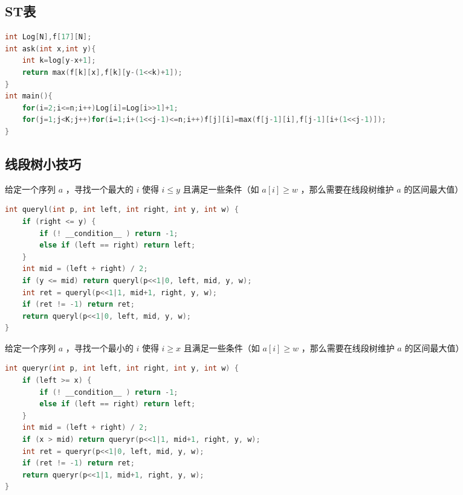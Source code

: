 \documentclass{article}
\begin{document}
\begin{CJK}{UTF8}{song}
\subsection{ST表}
\begin{lstlisting}[language=C++]
int Log[N],f[17][N];
int ask(int x,int y){
	int k=log[y-x+1];
	return max(f[k][x],f[k][y-(1<<k)+1]);
}
int main(){
	for(i=2;i<=n;i++)Log[i]=Log[i>>1]+1;
	for(j=1;j<K;j++)for(i=1;i+(1<<j-1)<=n;i++)f[j][i]=max(f[j-1][i],f[j-1][i+(1<<j-1)]);
}
\end{lstlisting}
\subsection{线段树小技巧}
给定一个序列 $a$ ，寻找一个最大的 $i$ 使得 $i \leq y$ 且满足一些条件（如 $a[i] \geq w$ ，那么需要在线段树维护 $a$ 的区间最大值）
\begin{lstlisting}[language=C++]
int queryl(int p, int left, int right, int y, int w) {
	if (right <= y) {
		if (! __condition__ ) return -1;
		else if (left == right) return left;
	}
	int mid = (left + right) / 2;
	if (y <= mid) return queryl(p<<1|0, left, mid, y, w);
	int ret = queryl(p<<1|1, mid+1, right, y, w);
	if (ret != -1) return ret;
	return queryl(p<<1|0, left, mid, y, w);
}
\end{lstlisting}
给定一个序列 $a$ ，寻找一个最小的 $i$ 使得 $i \geq x$ 且满足一些条件（如 $a[i] \geq w$ ，那么需要在线段树维护 $a$ 的区间最大值）
\begin{lstlisting}[language=C++]
int queryr(int p, int left, int right, int y, int w) {
	if (left >= x) {
		if (! __condition__ ) return -1;
		else if (left == right) return left;
	}
	int mid = (left + right) / 2;
	if (x > mid) return queryr(p<<1|1, mid+1, right, y, w);
	int ret = queryr(p<<1|0, left, mid, y, w);
	if (ret != -1) return ret;
	return queryr(p<<1|1, mid+1, right, y, w);
}
\end{lstlisting}

\end{CJK}
\end{document}
